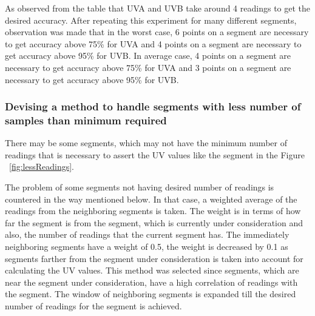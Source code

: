 \documentclass[10pt]{sigplan-proc-varsize}
\begin{document}
As observed from the table that UVA and UVB take around 4 readings to get the desired accuracy. After repeating this experiment for many different segments, observation was made that in the worst case, 6 points on a segment are necessary to get accuracy above 75\% for UVA and 4 points on a segment are necessary to get accuracy above 95\% for UVB.
In average case, 4 points on a segment are necessary to get accuracy above 75\% for UVA and  3 points on a segment are necessary to get accuracy above 95\% for UVB.


\subsubsection{Devising a method to handle segments with less number of samples than minimum required}
There may be some segments, which may not have the minimum number of readings that is necessary to assert the UV values like the segment in the Figure ~\ref{fig:lessReadings}. 

The problem of some segments not having desired number of readings is countered in the way mentioned below. In that case, a weighted average of the readings from the neighboring segments is taken. The weight is in terms of how far the segment is from the segment, which is currently under consideration and also, the number of readings that the current segment has. The immediately neighboring segments have a weight of 0.5, the weight is decreased by 0.1 as segments farther from the segment under consideration is taken into account for calculating the UV values. This method was selected since segments, which are near the segment under consideration, have a high correlation of readings with the segment. The window of neighboring segments is expanded till the desired number of readings for the segment is achieved. 
\end{document}
